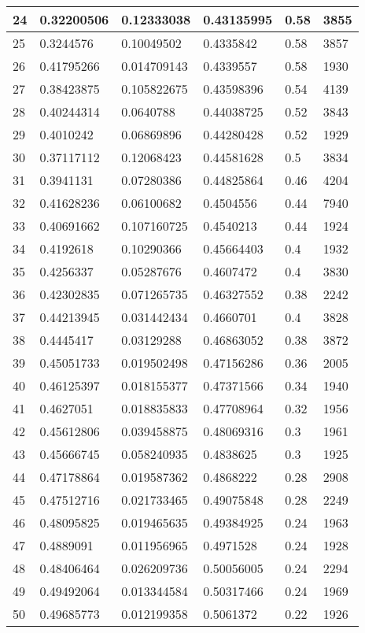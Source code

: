 \begin{longtable}{|l|l|l|l|l|l|}
24 & 0.32200506 & 0.12333038 & 0.43135995 & 0.58 & 3855 \\ \hline 
25 & 0.3244576 & 0.10049502 & 0.4335842 & 0.58 & 3857 \\ \hline 
26 & 0.41795266 & 0.014709143 & 0.4339557 & 0.58 & 1930 \\ \hline 
27 & 0.38423875 & 0.105822675 & 0.43598396 & 0.54 & 4139 \\ \hline 
28 & 0.40244314 & 0.0640788 & 0.44038725 & 0.52 & 3843 \\ \hline 
29 & 0.4010242 & 0.06869896 & 0.44280428 & 0.52 & 1929 \\ \hline 
30 & 0.37117112 & 0.12068423 & 0.44581628 & 0.5 & 3834 \\ \hline 
31 & 0.3941131 & 0.07280386 & 0.44825864 & 0.46 & 4204 \\ \hline 
32 & 0.41628236 & 0.06100682 & 0.4504556 & 0.44 & 7940 \\ \hline 
33 & 0.40691662 & 0.107160725 & 0.4540213 & 0.44 & 1924 \\ \hline 
34 & 0.4192618 & 0.10290366 & 0.45664403 & 0.4 & 1932 \\ \hline 
35 & 0.4256337 & 0.05287676 & 0.4607472 & 0.4 & 3830 \\ \hline 
36 & 0.42302835 & 0.071265735 & 0.46327552 & 0.38 & 2242 \\ \hline 
37 & 0.44213945 & 0.031442434 & 0.4660701 & 0.4 & 3828 \\ \hline 
38 & 0.4445417 & 0.03129288 & 0.46863052 & 0.38 & 3872 \\ \hline 
39 & 0.45051733 & 0.019502498 & 0.47156286 & 0.36 & 2005 \\ \hline 
40 & 0.46125397 & 0.018155377 & 0.47371566 & 0.34 & 1940 \\ \hline 
41 & 0.4627051 & 0.018835833 & 0.47708964 & 0.32 & 1956 \\ \hline 
42 & 0.45612806 & 0.039458875 & 0.48069316 & 0.3 & 1961 \\ \hline 
43 & 0.45666745 & 0.058240935 & 0.4838625 & 0.3 & 1925 \\ \hline 
44 & 0.47178864 & 0.019587362 & 0.4868222 & 0.28 & 2908 \\ \hline 
45 & 0.47512716 & 0.021733465 & 0.49075848 & 0.28 & 2249 \\ \hline 
46 & 0.48095825 & 0.019465635 & 0.49384925 & 0.24 & 1963 \\ \hline 
47 & 0.4889091 & 0.011956965 & 0.4971528 & 0.24 & 1928 \\ \hline 
48 & 0.48406464 & 0.026209736 & 0.50056005 & 0.24 & 2294 \\ \hline 
49 & 0.49492064 & 0.013344584 & 0.50317466 & 0.24 & 1969 \\ \hline 
50 & 0.49685773 & 0.012199358 & 0.5061372 & 0.22 & 1926 \\ \hline 
\end{longtable}